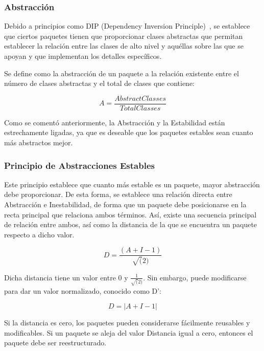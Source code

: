 \documentclass[11pt]{article}
\begin{document}
\subsubsection{Abstracción}
Debido a principios como DIP (Dependency Inversion Principle)~\cite{unclebob:stabilityandabstraction}, se establece que ciertos paquetes tienen que proporcionar clases abstractas que permitan establecer la relación entre las clases de alto nivel y aquéllas sobre las que se apoyan y que implementan los detalles específicos.

Se define como la abstracción de un paquete a la relación existente entre el número de clases abstractas y el total de clases que contiene:

\begin{equation}
A = \frac{Abstract Classes}{Total Classes}
\end{equation}

Como se comentó anteriormente, la Abstracción y la Estabilidad están estrechamente ligadas, ya que es deseable que los paquetes estables sean cuanto más abstractos mejor.

\subsubsection{Principio de Abstracciones Estables}

Este principio establece que cuanto más estable es un paquete, mayor abstracción debe proporcionar. De esta forma, se establece una relación directa entre Abstracción e Inestabilidad, de forma que un paquete debe posicionarse en la recta principal que relaciona ambos términos. Así, existe una secuencia principal de relación entre ambos, así como la distancia de la que se encuentra un paquete respecto a dicho valor. 

\begin{equation}
D = \frac{(A+I-1)}{\sqrt(2)}
\end{equation}

Dicha distancia tiene un valor entre 0 y $\frac{1}{\sqrt(2)}$. Sin embargo, puede modificarse para dar un valor normalizado, conocido como D':

\begin{equation}
D = |A+I-1|
\end{equation}

Si la distancia es cero, los paquetes pueden considerarse fácilmente reusables y modificables. Si un paquete se aleja del valor Distancia igual a cero, entonces el paquete debe ser reestructurado.
\end{document}
